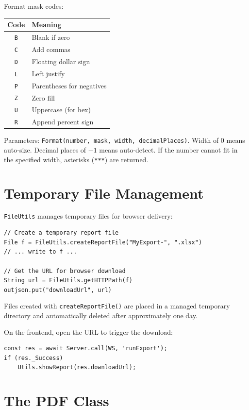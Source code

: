 \noindent
Format mask codes:

\begin{longtable}{cl}
\toprule
\textbf{Code} & \textbf{Meaning} \\
\midrule
\endhead
\texttt{B} & Blank if zero \\
\texttt{C} & Add commas \\
\texttt{D} & Floating dollar sign \\
\texttt{L} & Left justify \\
\texttt{P} & Parentheses for negatives \\
\texttt{Z} & Zero fill \\
\texttt{U} & Uppercase (for hex) \\
\texttt{R} & Append percent sign \\
\bottomrule
\end{longtable}

\noindent
Parameters: \texttt{Format(number, mask, width, decimalPlaces)}.  Width of 0 means auto-size.  Decimal places of $-1$ means auto-detect.  If the number cannot fit in the specified width, asterisks (\texttt{***}) are returned.

\section{Temporary File Management}
\label{sec:rpt-tempfiles}

\texttt{FileUtils} manages temporary files for browser delivery:

\begin{lstlisting}[style=groovy]
// Create a temporary report file
File f = FileUtils.createReportFile("MyExport-", ".xlsx")
// ... write to f ...

// Get the URL for browser download
String url = FileUtils.getHTTPPath(f)
outjson.put("downloadUrl", url)
\end{lstlisting}

\noindent
Files created with \texttt{createReportFile()} are placed in a managed temporary directory and automatically deleted after approximately one day.

On the frontend, open the URL to trigger the download:

\begin{lstlisting}[style=javascript]
const res = await Server.call(WS, 'runExport');
if (res._Success)
    Utils.showReport(res.downloadUrl);
\end{lstlisting}

\section{The PDF Class}
\label{sec:rpt-pdf}

